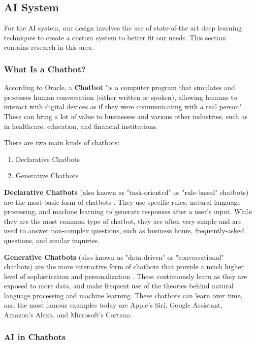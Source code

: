 \documentclass[titlepage, 12pt]{article}
\begin{document}
\subsection{AI System}

For the AI system, our design involves the use of state-of-the art deep learning techniques to create a custom system to better fit our needs. This section contains research in this area.

\subsubsection{What Is a Chatbot?}

According to Oracle, a \textbf{Chatbot} "is a computer program that simulates and processes human conversation (either written or spoken), allowing humans to interact with digital devices as if they were communicating with a real person" \cite{bib-1-7}. These can bring a lot of value to businesses and various other industries, such as in healthcare, education, and financial institutions.

There are two main kinds of chatbots:

\begin{enumerate}
    \item Declarative Chatbots
    \item Generative Chatbots
\end{enumerate}

\textbf{Declarative Chatbots} (also known as "task-oriented" or "rule-based" chatbots) are the most basic form of chatbots \cite{bib-1-7}. They use specific rules, natural language processing, and machine learning to generate responses after a user's input. While they are the most common type of chatbot, they are often very simple and are used to answer non-complex questions, such as business hours, frequently-asked questions, and similar inquiries.

\textbf{Generative Chatbots} (also known as "data-driven" or "conversational" chatbots) are the more interactive form of chatbots that provide a much higher level of sophistication and personalization \cite{bib-1-7}. These continuously learn as they are exposed to more data, and make frequent use of the theories behind natural language processing and machine learning. These chatbots can learn over time, and the most famous examples today are Apple's Siri, Google Assistant, Amazon's Alexa, and Microsoft's Cortana.

\subsubsection{AI in Chatbots}
\end{document}
